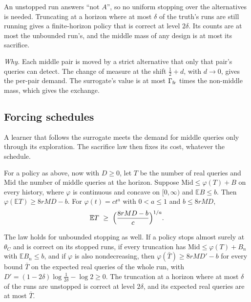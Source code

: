 
An unstopped run answers ``not $A$'', so no uniform stopping over the alternatives is needed.
Truncating at a horizon where at most $\delta$ of the truth's runs are still running gives a
finite-horizon policy that is correct at level $2\delta$. Its counts are at most the unbounded
run's, and the middle mass of any design is at most its sacrifice.

\emph{Why.} Each middle pair is moved by a strict alternative that only that pair's queries can
detect. The change of measure at the shift $\frac12+d$, with $d\to0$, gives the per-pair demand.
The surrogate's value is at most $\Gamma_{\rm fr}$ times the non-middle mass, which gives the
exchange.

\subsection{Forcing schedules}

A learner that follows the surrogate meets the demand for middle queries only through its
exploration. The sacrifice law then fixes its cost, whatever the schedule.

\begin{theorem}
\label{thm:forcing}
For a policy as above, now with $D\ge0$, let $T$ be the number of real queries and $\mathrm{Mid}$
the number of middle queries at the horizon. Suppose $\mathrm{Mid}\le\varphi(T)+B$ on every
history, where
$\varphi$ is continuous and concave on $[0,\infty)$ and $\mathbb{E}B\le b$. Then
$\varphi(\mathbb{E}T)\ge8rMD-b$. For $\varphi(t)=ct^{a}$ with $0<a\le1$ and
$b\le 8rMD$,
\[
\mathbb{E}T\ \ge\ \Bigl(\frac{8rMD-b}{c}\Bigr)^{1/a}.
\]
\end{theorem}


The law holds for unbounded stopping as well. If a policy stops almost surely at $\theta_C$ and is
correct on its stopped runs, if every truncation has $\mathrm{Mid}\le\varphi(T)+B_n$ with
$\mathbb EB_n\le b$, and if $\varphi$ is also nondecreasing, then
$\varphi(\bar T)\ge8rMD'-b$ for every bound $\bar T$ on the expected real queries of the whole
run, with $D'=(1-2\delta)\log\frac1{2\delta}-\log2\ge0$. The truncation at a horizon where at most
$\delta$ of the runs are unstopped is correct at level $2\delta$, and its expected real queries are
at most $\bar T$.

